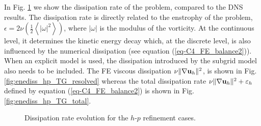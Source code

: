 In Fig. \ref{fig:enediss_hp_TG} we show the dissipation rate of the problem, compared to the DNS results. The dissipation rate is directly related to the enstrophy of the problem, $\epsilon = 2\nu\left(\frac{1}{2}\left\langle|\omega|^2\right\rangle\right)$, where $|\omega|$ is the modulus of the vorticity. At the continuous level, it determines the kinetic energy decay which, at the discrete level, is also influenced by the numerical dissipation (see equation (\ref{eq-C4_FE_balance2})). When an explicit model is used, the dissipation introduced by the subgrid model also needs to be included. The FE viscous dissipation $\nu\|\nabla{\bf u}_h\|^2$, is shown in Fig. \ref{fig:enediss_hp_TG_resolved} whereas the total dissipation rate $ \nu\|\nabla{\bf u}_h\|^2 + \varepsilon_{h}$ defined by equation (\ref{eq-C4_FE_balance2}) is shown in Fig. \ref{fig:enediss_hp_TG_total}. 
\begin{figure}[h!]
	\centering	
	\caption{Dissipation rate evolution for the $h$-$p$ refinement cases.}
	\label{fig:enediss_hp_TG}
\end{figure}

